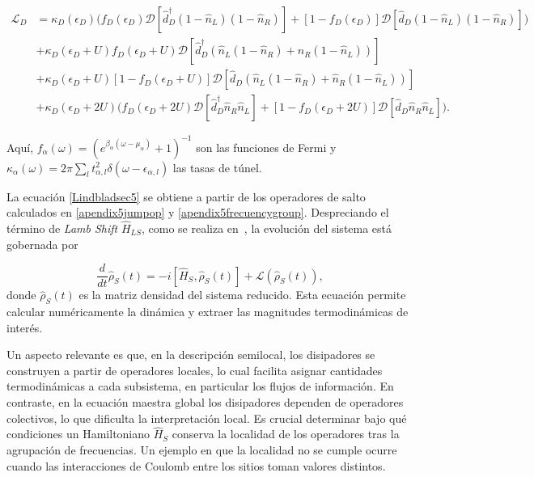 \begin{align*}
\mathcal{L}_D &= \kappa_D(\epsilon_D)\big( f_D(\epsilon_D)\mathcal{D}[\hat{d}^\dagger_D(1-\hat{n}_L)(1-\hat{n}_R)] + [1-f_D(\epsilon_D)]\mathcal{D}[\hat{d}_D(1-\hat{n}_L)(1-\hat{n}_R)] \big) \\ 
&+ \kappa_D(\epsilon_D+U) f_D(\epsilon_D+U)\mathcal{D}[\hat{d}^\dagger_D(\hat{n}_L(1-\hat{n}_R) + \hat{n}_R(1-\hat{n}_L) )] \\
&+ \kappa_D(\epsilon_D+U) [1-f_D(\epsilon_D+U)]\mathcal{D}[\hat{d}_D(\hat{n}_L(1-\hat{n}_R) + \hat{n}_R(1-\hat{n}_L))]  \\
&+ \kappa_D(\epsilon_D+2U)\big( f_D(\epsilon_D+2U)\mathcal{D}[\hat{d}^\dagger_D\hat{n}_R\hat{n}_L] + [1-f_D(\epsilon_D+2U)]\mathcal{D}[\hat{d}_D\hat{n}_R\hat{n}_L] \big).
\end{align*}

Aquí, $f_\alpha(\omega) = (e^{\beta_\alpha(\omega-\mu_\alpha)}+1)^{-1}$ son las funciones de Fermi y $\kappa_\alpha(\omega) = 2\pi\sum_l t^2_{\alpha,l}\delta(\omega-\epsilon_{\alpha,l})$ las tasas de túnel. 

La ecuación \eqref{Lindbladsec5} se obtiene a partir de los operadores de salto calculados en \ref{apendix5jumpop} y \ref{apendix5frecuencygroup}. Despreciando el término de \textit{Lamb Shift} $\hat{H}_{LS}$, como se realiza en~\cite{prech2023entanglement}, la evolución del sistema está gobernada por  

\begin{equation}
    \frac{d}{dt}\hat{\rho}_{S}(t) = -i[\hat{H}_{S},\hat{\rho}_{S}(t)] + \mathcal{L}(\hat{\rho}_{S}(t)),
\end{equation}
donde $\hat{\rho}_{S}(t)$ es la matriz densidad del sistema reducido. Esta ecuación permite calcular numéricamente la dinámica y extraer las magnitudes termodinámicas de interés.  

Un aspecto relevante es que, en la descripción semilocal, los disipadores se construyen a partir de operadores locales, lo cual facilita asignar cantidades termodinámicas a cada subsistema, en particular los flujos de información. En contraste, en la ecuación maestra global los disipadores dependen de operadores colectivos, lo que dificulta la interpretación local. Es crucial determinar bajo qué condiciones un Hamiltoniano $\hat{H}_S$ conserva la localidad de los operadores tras la agrupación de frecuencias. Un ejemplo en que la localidad no se cumple ocurre cuando las interacciones de Coulomb entre los sitios toman valores distintos.

